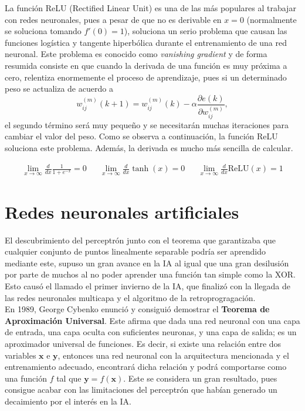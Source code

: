 \begin{itemize}
			La función ReLU (Rectified Linear Unit) es una de las más populares al trabajar con redes neuronales, pues a pesar de que no es derivable en $x = 0$ (normalmente se soluciona tomando $f'(0) = 1$), soluciona un serio problema que causan las funciones logística y tangente hiperbólica durante el entrenamiento de una red neuronal. Este problema es conocido como \textit{vanishing gradient} y de forma resumida consiste en que cuando la derivada de una función es muy próxima a cero, relentiza enormemente el proceso de aprendizaje, pues si un determinado peso se actualiza de acuerdo a $$w_{ij}^{(m)}(k+1) = w_{ij}^{(m)}(k) - \alpha\frac{\partial e(k)}{\partial w_{ij}^{(m)}},$$ el segundo término será muy pequeño y se necesitarán muchas iteraciones para cambiar el valor del peso. Como se observa a continuación, la función ReLU soluciona este problema. Además, la derivada es mucho más sencilla de calcular. 
			
			\begin{align*}
				\lim_{x\to\infty}\frac{d}{dx}\frac{1}{1+e^{-x}} = 0 && \lim_{x\to\infty}\frac{d}{dx}\tanh(x) = 0 && \lim_{x\to\infty}\frac{d}{dx}\text{ReLU}(x) = 1
			\end{align*}
			
		\end{itemize}
		
	\section{Redes neuronales artificiales}
	
		El descubrimiento del perceptrón junto con el teorema que garantizaba que cualquier conjunto de puntos linealmente separable podría ser aprendido mediante este, supuso un gran avance en la IA al igual que una gran desilusión por parte de muchos al no poder aprender una función tan simple como la XOR. Esto causó el llamado el primer invierno de la IA, que finalizó con la llegada de las redes neuronales multicapa y el algoritmo de la retroprogragación. \\
		
		En 1989, George Cybenko enunció y consiguió demostrar el \textbf{Teorema de Aproximación Universal}\cite{teoremaAproximacion}. Este afirma que dada una red neuronal con una capa de entrada, una capa oculta con suficientes neuronas, y una capa de salida; es un aproximador universal de funciones. Es decir, si existe una relación entre dos variables $\textbf{x}$ e $\textbf{y}$, entonces una red neuronal con la arquitectura mencionada y el entrenamiento adecuado, encontrará dicha relación y podrá comportarse como una función $f$ tal que $\textbf{y} = f(\textbf{x})$. Este se considera un gran resultado, pues consigue acabar con las limitaciones del perceptrón que habían generado un decaimiento por el interés en la IA. 
		
